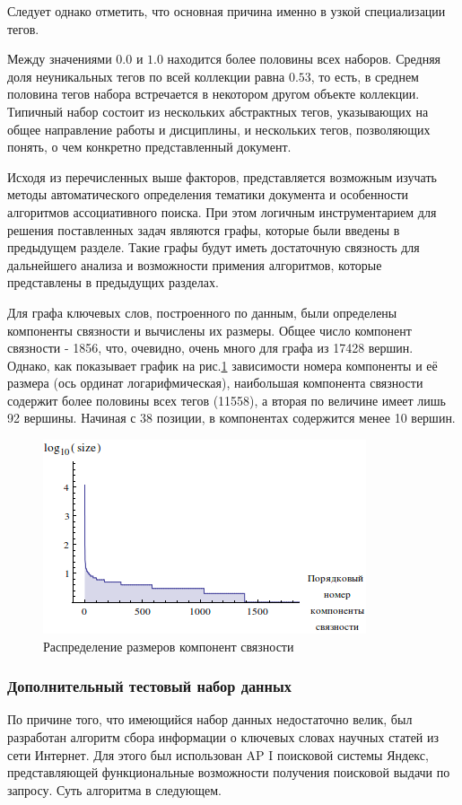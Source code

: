 Следует однако отметить, что основная причина именно в узкой специализации тегов.

Между значениями $0.0$ и $1.0$ находится более половины всех наборов. Средняя доля неуникальных тегов по всей коллекции равна $0.53$, то есть, в среднем половина тегов набора встречается в некотором другом объекте коллекции. Типичный набор состоит из нескольких абстрактных тегов, указывающих на общее направление работы и дисциплины, и нескольких тегов, позволяющих понять, о чем конкретно представленный документ.

Исходя из перечисленных выше факторов, представляется возможным изучать методы автоматического определения тематики документа и особенности алгоритмов ассоциативного поиска. При этом логичным инструментарием для решения поставленных задач являются графы, которые были введены в предыдущем разделе. Такие графы будут иметь достаточную связность для дальнейшего анализа и возможности примения алгоритмов, которые представлены в предыдущих разделах.

Для графа ключевых слов, построенного по данным, были определены компоненты связности и вычислены их размеры. Общее число компонент связности - 1856, что, очевидно, очень много для графа из 17428 вершин. Однако, как показывает график на рис.\ref{img:abstr_hist_2} зависимости номера компоненты и её размера (ось ординат логарифмическая), наибольшая компонента связности содержит более половины всех тегов (11558), а вторая по величине имеет лишь 92 вершины. Начиная с 38 позиции, в компонентах содержится менее 10 вершин.

\begin{figure}[ht]
  \begin{minipage}[ht]{1.0\linewidth}\centering
    \includegraphics[width=0.5\linewidth]{Dissertation/pics/abstr_hist_2}
    \caption{Распределение размеров компонент связности}
  \end{minipage}
  \label{img:abstr_hist_2}
\end{figure}

\subsubsection{Дополнительный тестовый набор данных}
По причине того, что имеющийся набор данных недостаточно велик, был разработан алгоритм сбора информации о ключевых словах научных статей из сети Интернет. Для этого был использован AP I поисковой системы Яндекс, представляющей функциональные возможности получения поисковой выдачи по запросу. Суть алгоритма в следующем.  

